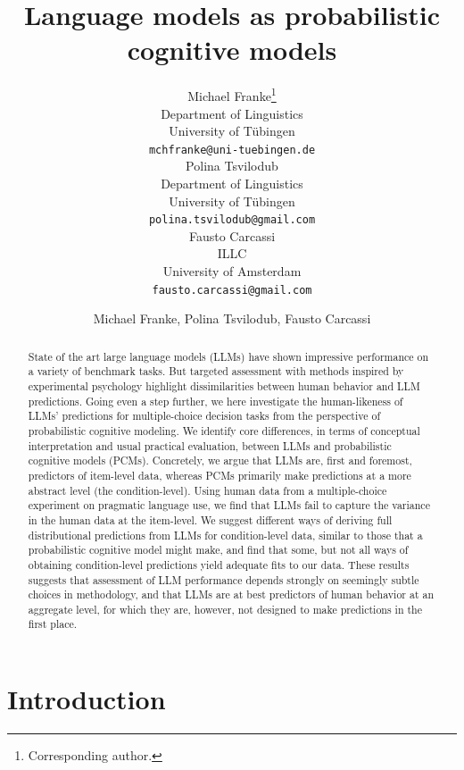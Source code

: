 \documentclass[fleqn]{article}
\title{Language models as probabilistic cognitive models}
\date{}
\author{ Michael Franke\thanks{Corresponding author.} \\
	Department of Linguistics\\
	University of Tübingen\\
	\texttt{mchfranke@uni-tuebingen.de} \\
	\And
	Polina Tsvilodub \\
	Department of Linguistics\\
	University of Tübingen\\
	\texttt{polina.tsvilodub@gmail.com} \\
	\And
	Fausto Carcassi \\
	ILLC\\
	University of Amsterdam\\
	\texttt{fausto.carcassi@gmail.com} \\
}
\author{Michael Franke, Polina Tsvilodub, Fausto Carcassi}
\affil{Department of Linguistics\\University of Tübingen\\
\texttt{[michael.franke|polina.tsvilodub|fausto.carcassi]@uni-tuebingen.de}}
\begin{document}
\maketitle

\begin{abstract}
  State of the art large language models (LLMs) have shown impressive performance on a variety of benchmark tasks.
  But targeted assessment with methods inspired by experimental psychology highlight dissimilarities between human behavior and LLM predictions.
  Going even a step further, we here investigate the human-likeness of LLMs' predictions for multiple-choice decision tasks from the perspective of probabilistic cognitive modeling.
  We identify core differences, in terms of conceptual interpretation and usual practical evaluation, between LLMs and probabilistic cognitive models (PCMs).
  Concretely, we argue that LLMs are, first and foremost, predictors of item-level data, whereas PCMs primarily make predictions at a more abstract level (the condition-level).
  Using human data from a multiple-choice experiment on pragmatic language use, we find that LLMs fail to capture the variance in the human data at the item-level.
  We suggest different ways of deriving full distributional predictions from LLMs for condition-level data, similar to those that a probabilistic cognitive model might make, and find that some, but not all ways of obtaining condition-level predictions yield adequate fits to our data.
  These results suggests that assessment of LLM performance depends strongly on seemingly subtle choices in methodology, and that LLMs are at best predictors of human behavior at an aggregate level, for which they are, however, not designed to make predictions in the first place.
\end{abstract}



\section{Introduction}
\label{sec:introduction}
\end{document}
